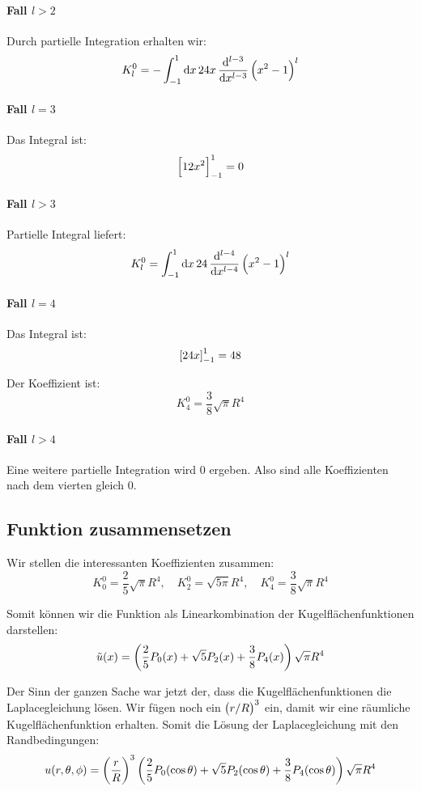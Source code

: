 \paragraph{Fall $l > 2$}

Durch partielle Integration erhalten wir:
\[
K_l^0 = - \int_{-1}^1 \dif x \, 24 x \dod[l-3]{}x \del{x^2-1}^l
\]

\paragraph{Fall $l = 3$}

Das Integral ist:
\[
\sbr{12 x^2}_{-1}^1 = 0
\]

\paragraph{Fall $l > 3$}

Partielle Integral liefert:
\[
K_l^0 = \int_{-1}^1 \dif x \, 24 \dod[l-4]{}x \del{x^2-1}^l
\]

\paragraph{Fall $l = 4$}

Das Integral ist:
\[
\sbr{24x}_{-1}^1 = 48
\]

Der Koeffizient ist:
\[
K_4^0 = \frac{3}{8} \sqrt{\pi} R^4
\]

\paragraph{Fall $l > 4$}

Eine weitere partielle Integration wird 0 ergeben. Also sind alle Koeffizienten
nach dem vierten gleich 0.

\subsection{Funktion zusammensetzen}

Wir stellen die interessanten Koeffizienten zusammen:
\[
K_0^0 = \frac 25 \sqrt{\pi} R^4
,\quad
K_2^0 = \sqrt{5 \pi} R^4
,\quad
K_4^0 = \frac{3}{8} \sqrt{\pi} R^4
\]

Somit können wir die Funktion als Linearkombination der Kugelflächenfunktionen
darstellen:
\[
\tilde u(x) = \del{\frac 25 P_0(x) + \sqrt{5} P_2(x) + \frac{3}{8} P_4(x)} \sqrt{\pi} R^4
\]

Der Sinn der ganzen Sache war jetzt der, dass die Kugelflächenfunktionen die
Laplacegleichung lösen. Wir fügen noch ein $\del{r/R}^3$ ein, damit wir eine
räumliche Kugelflächenfunktion erhalten. Somit die Lösung der Laplacegleichung
mit den Randbedingungen:
\[
u(r, \theta, \phi) = \del{\frac rR}^3 \del{\frac 25 P_0(\cos \theta) + \sqrt{5} P_2(\cos \theta) + \frac{3}{8} P_4(\cos \theta)} \sqrt{\pi} R^4
\]

